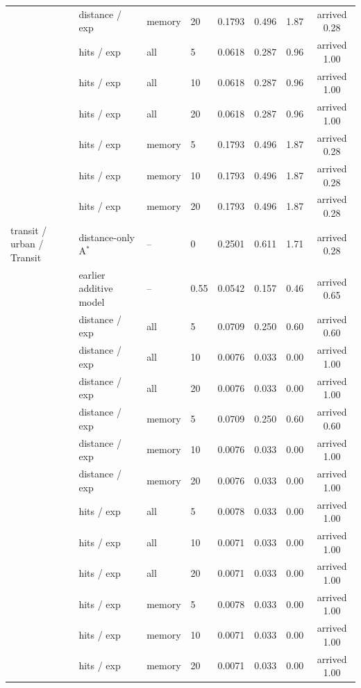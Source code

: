 \begin{tabular}{llllcccc}
 & distance / exp & memory & 20 & 0.1793 & 0.496 & 1.87 & arrived 0.28 \\
 & hits / exp & all & 5 & 0.0618 & 0.287 & 0.96 & arrived 1.00 \\
 & hits / exp & all & 10 & 0.0618 & 0.287 & 0.96 & arrived 1.00 \\
 & hits / exp & all & 20 & 0.0618 & 0.287 & 0.96 & arrived 1.00 \\
 & hits / exp & memory & 5 & 0.1793 & 0.496 & 1.87 & arrived 0.28 \\
 & hits / exp & memory & 10 & 0.1793 & 0.496 & 1.87 & arrived 0.28 \\
 & hits / exp & memory & 20 & 0.1793 & 0.496 & 1.87 & arrived 0.28 \\
\midrule
transit / urban / Transit & distance-only A$^*$ & -- & 0 & 0.2501 & 0.611 & 1.71 & arrived 0.28 \\
 & earlier additive model & -- & 0.55 & 0.0542 & 0.157 & 0.46 & arrived 0.65 \\
 & distance / exp & all & 5 & 0.0709 & 0.250 & 0.60 & arrived 0.60 \\
 & distance / exp & all & 10 & 0.0076 & 0.033 & 0.00 & arrived 1.00 \\
 & distance / exp & all & 20 & 0.0076 & 0.033 & 0.00 & arrived 1.00 \\
 & distance / exp & memory & 5 & 0.0709 & 0.250 & 0.60 & arrived 0.60 \\
 & distance / exp & memory & 10 & 0.0076 & 0.033 & 0.00 & arrived 1.00 \\
 & distance / exp & memory & 20 & 0.0076 & 0.033 & 0.00 & arrived 1.00 \\
 & hits / exp & all & 5 & 0.0078 & 0.033 & 0.00 & arrived 1.00 \\
 & hits / exp & all & 10 & 0.0071 & 0.033 & 0.00 & arrived 1.00 \\
 & hits / exp & all & 20 & 0.0071 & 0.033 & 0.00 & arrived 1.00 \\
 & hits / exp & memory & 5 & 0.0078 & 0.033 & 0.00 & arrived 1.00 \\
 & hits / exp & memory & 10 & 0.0071 & 0.033 & 0.00 & arrived 1.00 \\
 & hits / exp & memory & 20 & 0.0071 & 0.033 & 0.00 & arrived 1.00 \\
\bottomrule
\end{tabular}
